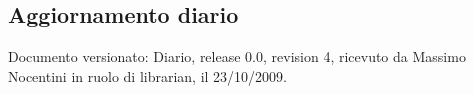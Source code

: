 \subsection{Aggiornamento diario}
Documento versionato: Diario, release 0.0, revision 4, ricevuto da Massimo Nocentini in ruolo di librarian, il 23/10/2009. 
